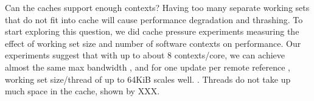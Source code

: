 	Can the caches support enough contexts? Having too many separate working sets that do not fit into cache will cause performance degradation and thrashing. To start exploring this question, we did cache pressure experiments measuring the effect of working set size and number of software contexts on performance.  Our experiments suggest that with up to about 8 contexts/core, we can achieve almost the same max bandwidth , and for one update per remote reference , working set size/thread of up to 64KiB scales well. .  Threads do not take up much space in the cache, shown by XXX.


